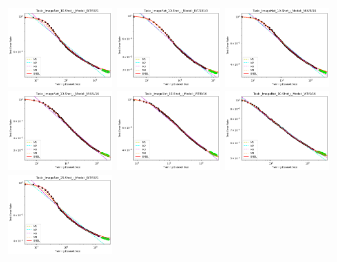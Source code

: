\documentclass{article} %
\begin{document}
\begin{figure}
\includegraphics[width=0.245\textwidth]{figures/scaling_laws_benchmark_dataset_plots__all_functional_forms/few_shot_10___BiT_50_1.png}
\includegraphics[width=0.245\textwidth]{figures/scaling_laws_benchmark_dataset_plots__all_functional_forms/few_shot_10___BiT_101_3.png}
\includegraphics[width=0.245\textwidth]{figures/scaling_laws_benchmark_dataset_plots__all_functional_forms/few_shot_10___MiX_B_16.png}
\includegraphics[width=0.245\textwidth]{figures/scaling_laws_benchmark_dataset_plots__all_functional_forms/few_shot_10___MiX_L_16.png}
\includegraphics[width=0.245\textwidth]{figures/scaling_laws_benchmark_dataset_plots__all_functional_forms/few_shot_10___ViT_B_16.png}
\includegraphics[width=0.245\textwidth]{figures/scaling_laws_benchmark_dataset_plots__all_functional_forms/few_shot_10___ViT_S_16.png}
\includegraphics[width=0.245\textwidth]{figures/scaling_laws_benchmark_dataset_plots__all_functional_forms/few_shot_25___BiT_50_1.png}

\end{figure}
\end{document}
